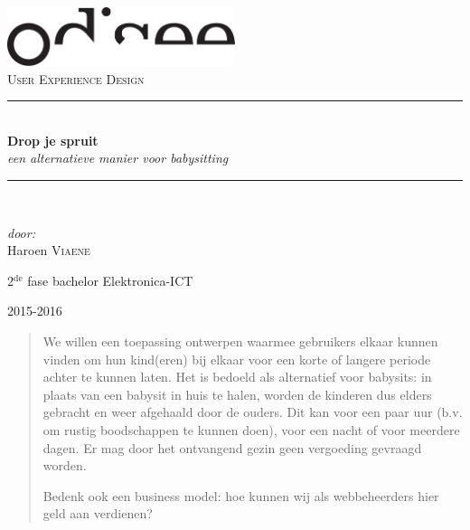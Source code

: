 \documentclass[a4paper,12pt]{article}
\newcommand{\HRule}{\rule{\linewidth}{0.5mm}}
\begin{document}
\begin{titlepage}
\begin{center}
\includegraphics[width=0.5\textwidth]{./logo.pdf}~\\[1cm]

\textsc{\Large User Experience Design}\\[0.5cm]

\HRule \\[0.4cm]
{ \LARGE \bfseries Drop je spruit}\\[0.4cm]
{\large \emph{een alternatieve manier voor babysitting}}\\[0.2cm]

\HRule \\[1.5cm]

\begin{minipage}{0.4\textwidth}
\begin{flushleft} \large
\emph{door:}\\
Haroen \textsc{Viaene}\\

\end{flushleft}
\end{minipage}
\begin{minipage}{0.4\textwidth}
\begin{flushright} \large
\large{2$^{\text{de}}$ fase bachelor Elektronica-ICT}\\
\end{flushright}
\end{minipage}

\vfill

{\large 2015-2016}

\end{center}
\end{titlepage}

\newpage

\tableofcontents

\newpage
\begin{abstract}
We willen een toepassing ontwerpen waarmee gebruikers elkaar kunnen vinden om hun kind(eren) bij elkaar voor een korte of langere periode achter te kunnen laten. Het is bedoeld als alternatief voor babysits: in plaats van een babysit in huis te halen, worden de kinderen dus elders gebracht en weer afgehaald door de ouders. Dit kan voor een paar uur (b.v. om rustig boodschappen te kunnen doen), voor een nacht of voor meerdere dagen. Er mag door het ontvangend gezin geen vergoeding gevraagd worden.

Bedenk ook een business model: hoe kunnen wij als webbeheerders hier geld aan verdienen?
\end{abstract}
\end{document}
